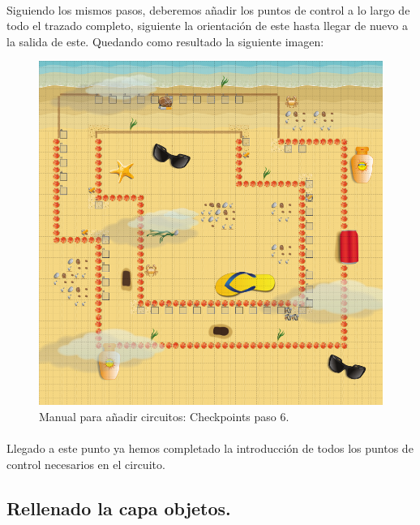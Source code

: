 \paragraph{}
Siguiendo los mismos pasos, deberemos añadir los puntos de control a lo largo de todo el trazado completo, siguiente la orientación
de este hasta llegar de nuevo a la salida de este. Quedando como resultado la siguiente imagen:

\begin{figure}[H]
  \label{checkpoints6}
  \begin{center}
    \includegraphics[scale=0.5]{imagenes/manualcircuito/checkpoints6.png}
  \end{center}
  \caption{Manual para añadir circuitos: Checkpoints paso 6.}
\end{figure}

\paragraph{}
Llegado a este punto ya hemos completado la introducción de todos los puntos de control necesarios en el circuito.

\subsection{Rellenado la capa objetos.}


